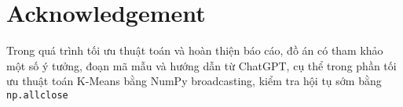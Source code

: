 \section{Acknowledgement}
Trong quá trình tối ưu thuật toán và hoàn thiện báo cáo, đồ án có tham khảo một số ý tưởng, đoạn mã mẫu và hướng dẫn từ ChatGPT, cụ thể trong phần tối ưu thuật toán K-Means bằng NumPy broadcasting, kiểm tra hội tụ sớm bằng \texttt{np.allclose}



